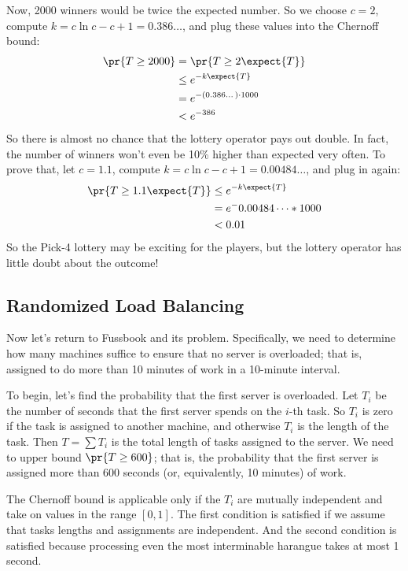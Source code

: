 Now, 2000 winners would be twice the expected
number.  So we choose $c = 2$, compute $k = c \ln c - c + 1 =
0.386\dots$, and plug these values into the Chernoff bound:
\begin{align*}
\pr{T \geq 2000} & = \pr{T \geq 2 \expect{T}} \\
  & \leq e^{-k \expect{T}} \\
  & = e^{- (0.386\dots) \cdot 1000} \\
  & < e^{-386}
\end{align*}
So there is almost no chance that the lottery operator pays out
double.  In fact, the number of winners won't even be 10\% higher than
expected very often.  To prove that, let $c = 1.1$, compute $k = c \ln
c - c + 1 = 0.00484\dots$, and plug in again:
\begin{align*}
\pr{T \geq 1.1 \expect{T}} & \leq e^{-k \expect{T}} \\
  & = e^- 0.00484\dots * 1000 \\
  & < 0.01
\end{align*}
So the Pick-4 lottery may be exciting for the players, but the lottery
operator has little doubt about the outcome!

\subsection{Randomized Load Balancing}

Now let's return to Fussbook and its  problem.
Specifically, we need to determine how many machines suffice to ensure
that no server is overloaded; that is, assigned to do more than 10
minutes of work in a 10-minute interval.

To begin, let's find the probability that the first server is
overloaded.  Let $T_i$ be the number of seconds that the first server
spends on the $i$-th task.  So $T_i$ is zero if the task is assigned
to another machine, and otherwise $T_i$ is the length of the task.
Then $T = \sum T_i$ is the total length of tasks assigned to the
server.  We need to upper bound $\pr{T \geq 600}$; that is, the
probability that the first server is assigned more than 600 seconds
(or, equivalently, 10 minutes) of work.

The Chernoff bound is applicable only if the $T_i$ are mutually
independent and take on values in the range $[0, 1]$.  The first
condition is satisfied if we assume that tasks lengths and assignments
are independent.  And the second condition is satisfied because
processing even the most interminable harangue takes at most 1 second.

